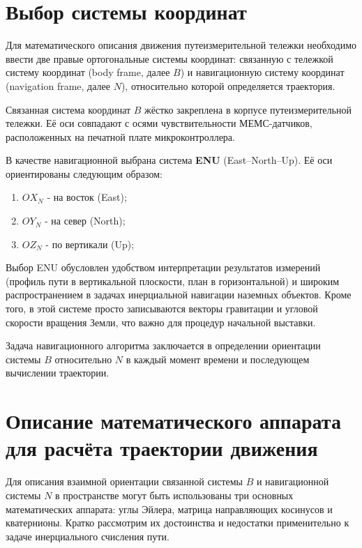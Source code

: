 
\section{Выбор системы координат}
\label{sec:coord_systems}

Для математического описания движения путеизмерительной тележки необходимо ввести две правые ортогональные системы координат: связанную с тележкой систему координат (body frame, далее $B$) и навигационную систему координат (navigation frame, далее $N$), относительно которой определяется траектория.

Связанная система координат $B$ жёстко закреплена в корпусе путеизмерительной тележки. Её оси совпадают с осями чувствительности МЕМС-датчиков, расположенных на печатной плате микроконтроллера.

В качестве навигационной выбрана система \textbf{ENU} (East–North–Up). Её оси ориентированы следующим образом:
\begin{enumerate}
	\item $OX_{N}$ - на восток (East);
	\item $OY_{N}$ - на север (North);
	\item $OZ_{N}$ - по вертикали (Up);
\end{enumerate}

Выбор ENU обусловлен удобством интерпретации результатов измерений (профиль пути в вертикальной плоскости, план в горизонтальной) и широким распространением в задачах инерциальной навигации наземных объектов. Кроме того, в этой системе просто записываются векторы гравитации и угловой скорости вращения Земли, что важно для процедур начальной выставки.

Задача навигационного алгоритма заключается в определении ориентации системы $B$ относительно $N$ в каждый момент времени и последующем вычислении траектории.


\section{Описание математического аппарата для расчёта траектории движения}
\label{sec:math_apparatus}

Для описания взаимной ориентации связанной системы $B$ и навигационной системы $N$ в пространстве могут быть использованы три основных математических аппарата: углы Эйлера, матрица направляющих косинусов и кватернионы. Кратко рассмотрим их достоинства и недостатки применительно к задаче инерциального счисления пути.

